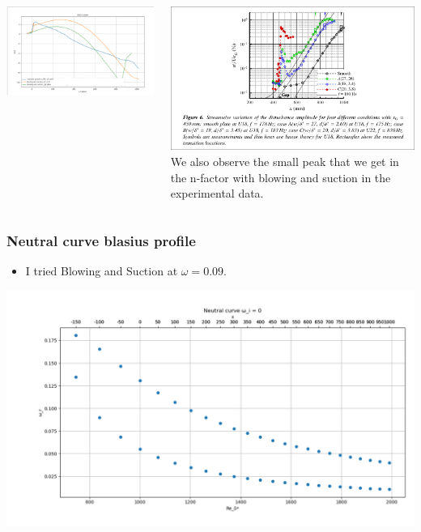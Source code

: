 \documentclass[
  aspectratio=169, %
  t, %
  onlytextwidth, %
  10pt, %
]{beamer}
\begin{document}
\begin{frame}
	\begin{columns}[T] %
		\begin{column}{0.49\linewidth} %
			\includegraphics[width=\linewidth]{Images/nfactor_curves.png}
		\end{column}
		\begin{column}{0.49\linewidth} %
			\includegraphics[width=\linewidth]{Images/dataJeff.png}
			We also observe the small peak that we get in the n-factor with blowing and suction in the experimental data.
		\end{column}
	\end{columns}
\end{frame}
\begin{frame}
  \frametitle{Neutral curve blasius profile}
  \begin{itemize}
    \item I tried Blowing and Suction at $\omega=0.09$. 
  \end{itemize}
  \centering
  \includegraphics[width=0.8\linewidth]{Images/neutralCurve_Blasius.png}
\end{frame}
\end{document}

